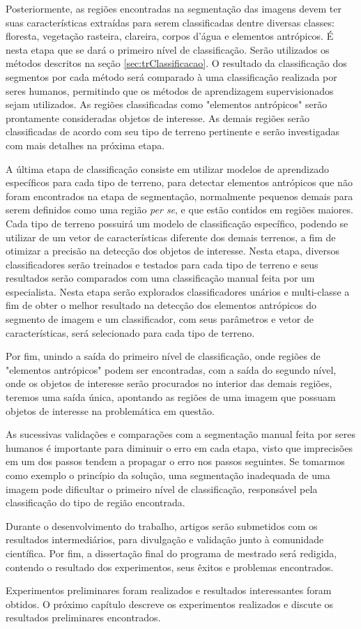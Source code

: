 Posteriormente, as regiões encontradas na segmentação das imagens devem ter suas características extraídas para serem classificadas dentre diversas classes: floresta, vegetação rasteira, clareira, corpos d'água e elementos antrópicos. É nesta etapa que se dará o primeiro nível de classificação. Serão utilizados os métodos descritos na seção \ref{sec:trClassificacao}. O resultado da classificação dos segmentos por cada método será comparado à uma classificação realizada por seres humanos, permitindo que os métodos de aprendizagem supervisionados sejam utilizados. As regiões classificadas como "elementos antrópicos" serão prontamente consideradas objetos de interesse. As demais regiões serão classificadas de acordo com seu tipo de terreno pertinente e serão investigadas com mais detalhes na próxima etapa.

A última etapa de classificação consiste em utilizar modelos de aprendizado específicos para cada tipo de terreno, para detectar elementos antrópicos que não foram encontrados na etapa de segmentação, normalmente pequenos demais para serem definidos como uma região \textit{per se}, e que estão contidos em regiões maiores. Cada tipo de terreno possuirá um modelo de classificação específico, podendo se utilizar de um vetor de características diferente dos demais terrenos, a fim de otimizar a precisão na detecção dos objetos de interesse. Nesta etapa, diversos classificadores serão treinados e testados para cada tipo de terreno e seus resultados serão comparados com uma classificação manual feita por um especialista. Nesta etapa serão explorados classificadores unários e multi-classe a fim de obter o melhor resultado na detecção dos elementos antrópicos do segmento de imagem e um classificador, com seus parâmetros e vetor de características, será selecionado para cada tipo de terreno.

Por fim, unindo a saída do primeiro nível de classificação, onde regiões de "elementos antrópicos" podem ser encontradas, com a saída do segundo nível, onde os objetos de interesse serão procurados no interior das demais regiões, teremos uma saída única, apontando as regiões de uma imagem que possuam objetos de interesse na problemática em questão.

As sucessivas validações e comparações com a segmentação manual feita por seres humanos é importante para diminuir o erro em cada etapa, visto que imprecisões em um dos passos tendem a propagar o erro nos passos seguintes. Se tomarmos como exemplo o princípio da solução, uma segmentação inadequada de uma imagem pode dificultar o primeiro nível de classificação, responsável pela classificação do tipo de região encontrada.

Durante o desenvolvimento do trabalho, artigos serão submetidos com os resultados intermediários, para divulgação e validação junto à comunidade científica. Por fim, a dissertação final do programa de mestrado será redigida, contendo o resultado dos experimentos, seus êxitos e problemas encontrados.

Experimentos preliminares foram realizados e resultados interessantes foram obtidos. O próximo capítulo descreve os experimentos realizados e discute os resultados preliminares encontrados.